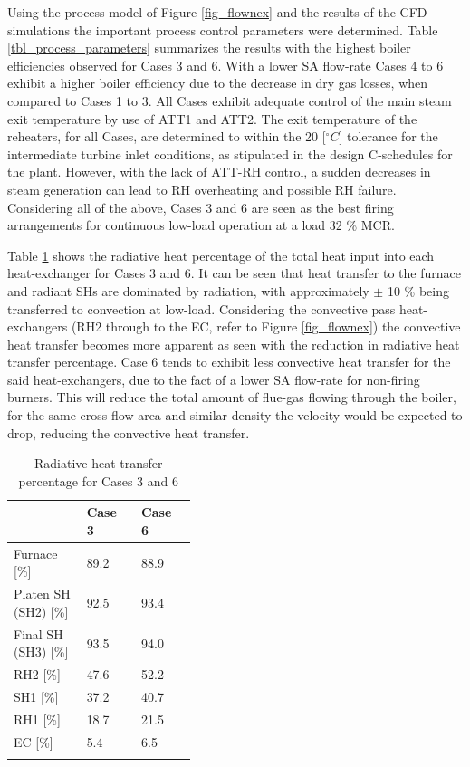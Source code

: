 \documentclass[review]{elsarticle}
\begin{document}
Using the process model of Figure \ref{fig_flownex} and the results of the CFD simulations the important process control parameters were determined. Table \ref{tbl_process_parameters} summarizes the results with the highest boiler efficiencies observed for Cases 3 and 6. With a lower SA flow-rate Cases 4 to 6 exhibit a higher boiler efficiency due to the decrease in dry gas losses, when compared to Cases 1 to 3. All Cases exhibit adequate control of the main steam exit temperature by use of ATT1 and ATT2. The exit temperature of the reheaters, for all Cases, are determined to within the 20 [$^\circ C$] tolerance for the intermediate turbine inlet conditions, as stipulated in the design C-schedules for the plant. However, with the lack of ATT-RH control, a sudden decreases in steam generation can lead to RH overheating and possible RH failure. Considering all of the above, Cases 3 and 6 are seen as the best firing arrangements for continuous low-load operation at a load 32 \% MCR.

Table \ref{tbl_rad_conv} shows the radiative heat percentage of the total heat input into each heat-exchanger for Cases 3 and 6. It can be seen that heat transfer to the furnace and radiant SHs are dominated by radiation, with approximately $\pm$ 10 \% being transferred to convection at low-load. Considering the convective pass heat-exchangers (RH2 through to the EC, refer to Figure \ref{fig_flownex}) the convective heat transfer becomes more apparent as seen with the reduction in radiative heat transfer percentage. Case 6 tends to exhibit less convective heat transfer for the said  heat-exchangers, due to the fact of a lower SA flow-rate for non-firing burners. This will reduce the total amount of flue-gas flowing through the boiler, for the same cross flow-area and similar density the velocity would be expected to drop, reducing the convective heat transfer.

\begin{table}[h!]
\centering
\caption{Radiative heat transfer percentage for Cases 3 and 6}
\vspace{2mm}
{\tabulinesep=1.2mm
\begin{tabularx}{\linewidth}{p{0.4\linewidth} XX}
\hline
 &\textbf{Case 3}&\textbf{Case 6}\\
\hline
Furnace [\%] & 89.2 & 88.9\\
Platen SH (SH2) [\%] & 92.5& 93.4\\
Final SH (SH3) [\%] & 93.5& 94.0\\
RH2 [\%] & 47.6& 52.2\\
SH1 [\%] & 37.2& 40.7\\
RH1 [\%] & 18.7& 21.5\\
EC [\%] & 5.4& 6.5\\
\hline
\label{tbl_rad_conv}
\end{tabularx}}
\end{table}
\end{document}
